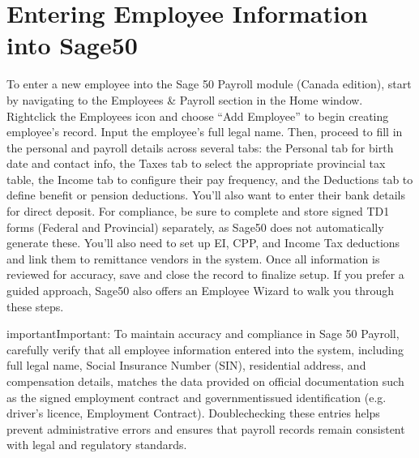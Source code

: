 \documentclass[letterpaper,10pt,english]{sphinxmanual}
\begin{document}
\section{Entering Employee Information into Sage50}
\label{\detokenize{onboarding_employee:entering-employee-information-into-sage50}}
\sphinxAtStartPar
To enter a new employee into the Sage 50 Payroll module (Canada edition), start by navigating to the Employees \& Payroll section in the
Home window. Right\sphinxhyphen{}click the Employees icon and choose “Add Employee” to begin creating employee’s record. Input the employee’s full legal
name. Then, proceed to fill in the personal and payroll details across several tabs: the Personal tab for birth date and contact info, the Taxes tab to select the appropriate provincial
tax table, the Income tab to configure their pay frequency, and the Deductions tab to define benefit or pension deductions. You’ll also
want to enter their bank details for direct deposit. For compliance, be sure to complete and store signed TD1 forms (Federal and Provincial)
separately, as Sage50 does not automatically generate these. You’ll also need to set up EI, CPP, and Income Tax deductions and link them to remittance vendors in the system. Once all
information is reviewed for accuracy, save and close the record to finalize setup. If you prefer a guided approach, Sage50 also offers
an Employee Wizard to walk you through these steps.

\begin{sphinxadmonition}{important}{Important:}
\sphinxAtStartPar
To maintain accuracy and compliance in Sage 50 Payroll, carefully verify that all employee information entered into the system,
including full legal name, Social Insurance Number (SIN), residential address, and compensation details, matches the data provided on
official documentation such as the signed employment contract and government\sphinxhyphen{}issued identification (e.g. driver’s licence, Employment Contract).
Double\sphinxhyphen{}checking these entries helps prevent administrative errors and ensures that payroll records remain consistent with legal and
regulatory standards.
\end{sphinxadmonition}

\noindent{}

\noindent{}

\noindent{}

\noindent{}
\end{document}
